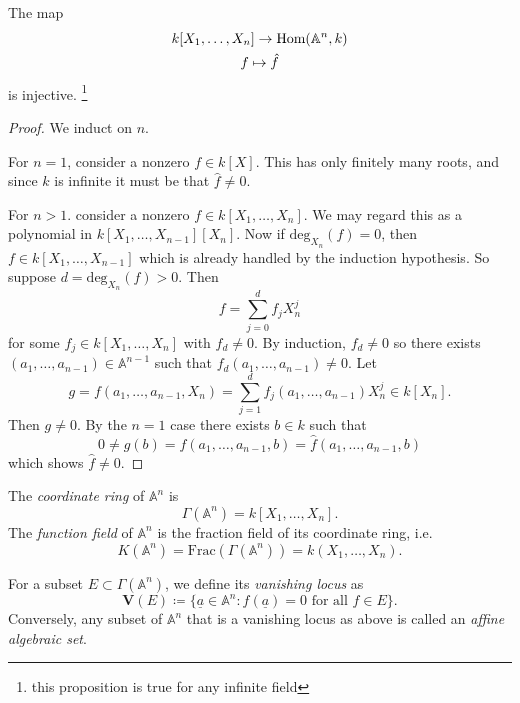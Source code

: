 \documentclass[12pt]{article}
\begin{document}
\begin{proposition}
	The map 
	\begin{gather*}
		k[X_1,\dots, X_n] \to \text{Hom}(\mathbb{A}^n, k) \\
		f\mapsto \hat{f}
	\end{gather*}
	is injective. \footnote{this proposition is true for any infinite field}
\end{proposition}
\begin{proof}
	We induct on $n$.

	For $n=1$, consider a nonzero $f\in k[X]$. This has only finitely many roots, and since $k$ is infinite it must be that $\hat{f}\neq 0$. 

	For $n>1$. consider a nonzero $f\in k[X_1,\dots, X_n]$. We may regard this as a polynomial in $k[X_1,\dots, X_{n-1}][X_n]$. Now if $\text{deg}_{X_n}(f)=0$, then $f\in k[X_1,\dots,X_{n-1}]$ which is already handled by the induction hypothesis. So suppose $d=\text{deg}_{X_n}(f)>0$. Then 
	\begin{equation*}
		f = \sum_{j=0}^d f_j X_n^j
	\end{equation*}
	for some $f_j\in k[X_1,\dots, X_n]$ with $f_d\neq 0$. By induction, $\hat{f_d}\neq 0$ so there exists $(a_1,\dots, a_{n-1})\in\mathbb{A}^{n-1}$ such that $f_d(a_1,\dots,a_{n-1})\neq 0$. Let 
	\begin{equation*}
		g = f(a_1,\dots,a_{n-1},X_n) = \sum_{j=1}^d f_j(a_1,\dots,a_{n-1})X_n^j \in k[X_n].
	\end{equation*}
	Then $g\neq 0$. By the $n=1$ case there exists $b\in k$ such that 
	\begin{equation*}
		0 \neq g(b) = f(a_1,\dots,a_{n-1},b)=\hat{f}(a_1,\dots,a_{n-1},b)
	\end{equation*}
	which shows $\hat{f}\neq 0$. 
\end{proof}

\begin{definition}
	The \emph{coordinate ring} of $\mathbb{A}^n$ is 
	\begin{equation*}
		\Gamma(\mathbb{A}^n) = k[X_1,\dots,X_n].
	\end{equation*}
	The \emph{function field} of $\mathbb{A}^n$ is the fraction field of its coordinate ring, i.e. 
	\begin{equation*}
		K(\mathbb{A}^n) = \text{Frac}(\Gamma(\mathbb{A}^n)) = k(X_1,\dots, X_n).
	\end{equation*}
\end{definition}

\begin{definition}
	For a subset $E\subset\Gamma(\mathbb{A}^n)$, we define its \emph{vanishing locus} as 
	\begin{equation*}
		\mathbf{V}(E) \coloneqq \{ \underline{a}\in\mathbb{A}^n : f(\underline{a})=0 \text{ for all } f\in E \}.
	\end{equation*}
	Conversely, any subset of $\mathbb{A}^n$ that is a vanishing locus as above is called an \emph{affine algebraic set}.
\end{definition}
\end{document}
